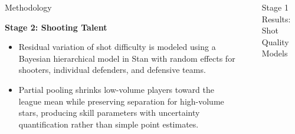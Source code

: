 \documentclass[final]{beamer}
\newlength{\sepwid}
\newlength{\onecolwid}
\begin{document}
\begin{frame}[t]
\begin{columns}[t]
\begin{column}{\onecolwid}
\begin{block}{Methodology}
\vspace{2ex}

\textbf{Stage 2: Shooting Talent} \\[0.5ex]
\begin{itemize}
\item Residual variation of shot difficulty is modeled using a Bayesian hierarchical model in Stan with random effects for shooters, individual defenders, and defensive teams.
\item Partial pooling shrinks low-volume players toward the league mean while preserving separation for high-volume stars, producing skill parameters with uncertainty quantification rather than simple point estimates.
\end{itemize}




\end{block}









\end{column}

\begin{column}{\sepwid}\end{column}


\begin{column}{\onecolwid}


\begin{block}{Stage 1 Results: Shot Quality Models}


\end{block}
\end{column}
\end{columns}
\end{frame}
\end{document}
